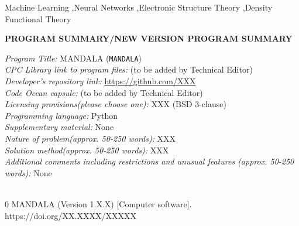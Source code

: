\documentclass[preprint,12pt, compress]{elsarticle}
\begin{document}
\begin{frontmatter}


\begin{abstract}
We present ...
\end{abstract}




\begin{keyword}
Machine Learning  \sep Neural Networks \sep Electronic Structure Theory \sep Density Functional Theory



\end{keyword}

\end{frontmatter}

{\bf PROGRAM SUMMARY/NEW VERSION PROGRAM SUMMARY}

\begin{small}
\noindent
{\em Program Title: }MANDALA (\texttt{MANDALA})       \\
{\em CPC Library link to program files:} (to be added by Technical Editor) \\
{\em Developer's repository link:} \url{https://github.com/XXX} \\
{\em Code Ocean capsule:} (to be added by Technical Editor)\\
{\em Licensing provisions(please choose one):} XXX (BSD 3-clause)  \\
{\em Programming language:} Python                                   \\
{\em Supplementary material:} None                                 \\
{\em Nature of problem(approx. 50-250 words):} XXX\\
{\em Solution method(approx. 50-250 words):} XXX\\
{\em Additional comments including restrictions and unusual features (approx. 50-250 words):} None\\
   \\

\begin{thebibliography}{0}
 MANDALA (Version 1.X.X) [Computer software]. https://doi.org/XX.XXXX/XXXXX


\end{thebibliography}
\end{small}
\end{document}
